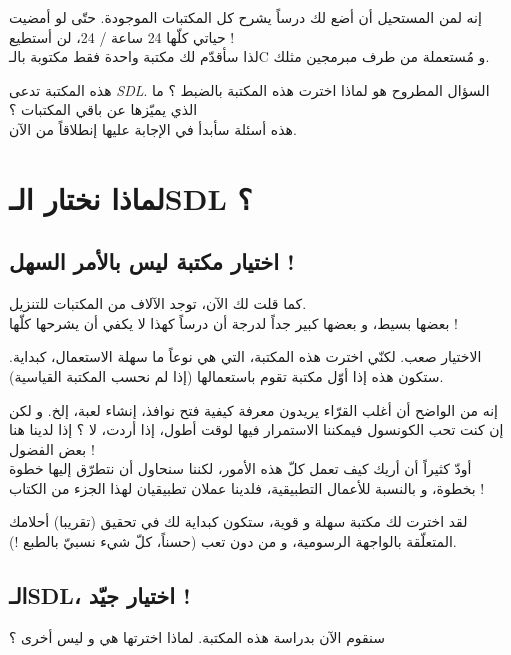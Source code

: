إنه لمن المستحيل أن أضع لك درساً يشرح كل المكتبات الموجودة. حتّى لو أمضيت حياتي كلّها 24 ساعة / 24، لن أستطيع !\\
لذا سأقدّم لك مكتبة واحدة فقط مكتوبة بالـ\textenglish{C} و مُستعملة من طرف مبرمجين مثلك. 

هذه المكتبة تدعى 
\textit{\textenglish{SDL}}.
السؤال المطروح هو لماذا اخترت هذه المكتبة بالضبط ؟ ما الذي يميّزها عن باقي المكتبات ؟\\
هذه أسئلة سأبدأ في الإجابة عليها إنطلاقاً من الآن.

\section{لماذا نختار الـ\textenglish{SDL} ؟}

\subsection{اختيار مكتبة ليس بالأمر السهل !}

كما قلت لك الآن، توجد الآلاف من المكتبات للتنزيل.\\
بعضها بسيط، و بعضها كبير جداً لدرجة أن درساً كهذا لا يكفي أن يشرحها كلّها !

الاختيار صعب. لكنّي اخترت هذه المكتبة، التي هي نوعاً ما سهلة الاستعمال، كبداية. ستكون هذه إذا أوّل مكتبة تقوم باستعمالها (إذا لم نحسب المكتبة القياسية).

إنه من الواضح أن أغلب القرّاء يريدون معرفة كيفية فتح نوافذ، إنشاء لعبة، إلخ. و لكن إن كنت تحب الكونسول فيمكننا الاستمرار فيها لوقت أطول، إذا أردت، لا ؟ إذا لدينا هنا بعض الفضول ! \\
أودّ كثيراً أن أريك كيف تعمل كلّ هذه الأمور، لكننا سنحاول أن نتطرّق إليها خطوة بخطوة، و بالنسبة للأعمال التطبيقية، فلدينا عملان تطبيقيان لهذا الجزء من الكتاب !

لقد اخترت لك مكتبة سهلة و قوية، ستكون كبداية لك في تحقيق (تقريبا) أحلامك المتعلّقة بالواجهة الرسومية، و من دون تعب (حسناً، كلّ شيء نسبيّ بالطبع !).
\subsection{الـ\textenglish{SDL}، اختيار جيّد !}

سنقوم الآن بدراسة هذه المكتبة. لماذا اخترتها هي و ليس أخرى ؟


